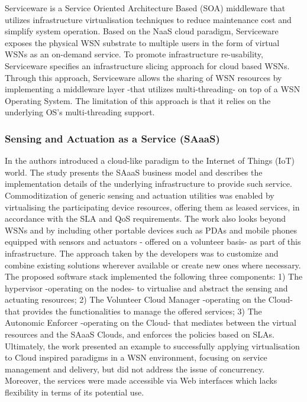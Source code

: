 Serviceware \cite{6529470} is a Service Oriented Architecture Based (SOA) middleware that utilizes infrastructure virtualisation techniques to reduce maintenance cost and simplify system operation. Based on the NaaS cloud paradigm, Serviceware exposes the physical WSN substrate to multiple users in the form of virtual WSNs as an on-demand service. To promote infrastructure re-usability, Serviceware specifies an infrastructure slicing approach for cloud based WSNs. Through this approach, Serviceware allows the sharing of WSN resources by implementing a middleware layer -that utilizes multi-threading- on top of a WSN Operating System. The limitation of this approach is that it relies on the underlying OS's multi-threading support.



\subsubsection{Sensing and Actuation as a Service (SAaaS)}

In \cite{SAaaS} the authors introduced a cloud-like paradigm to the Internet of Things (IoT) world. The study presents the SAaaS business model and describes the implementation details of the underlying infrastructure to provide such service. Commoditization of generic sensing and actuation utilities was enabled by virtualising the participating device resources, offering them as leased services, in accordance with the SLA and QoS requirements. The work also looks beyond WSNs and by including other portable devices such as PDAs and mobile phones equipped with sensors and actuators - offered on a volunteer basis- as part of this infrastructure. The approach taken by the developers was to customize and combine existing solutions wherever available or create new ones where necessary.  The proposed software stack implemented the following three components: 1) The hypervisor -operating on the nodes- to virtualise and abstract the sensing and actuating resources; 2) The Volunteer Cloud Manager -operating on the Cloud- that provides the functionalities to manage the offered services; 3) The Autonomic Enforcer -operating on the Cloud- that mediates between the virtual resources and the SAaaS Clouds, and enforces the policies based on SLAs. Ultimately, the work presented an example to successfully applying virtualisation to Cloud inspired paradigms in a WSN environment, focusing on service management and delivery, but did not address the issue of concurrency. Moreover, the services were made accessible via Web interfaces which lacks flexibility in terms of its potential use. 


